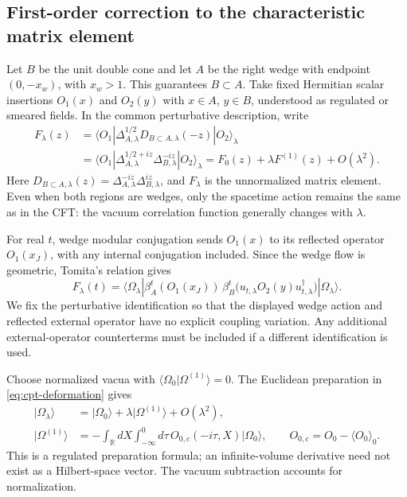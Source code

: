 \documentclass[a4paper,11pt]{article}
\theoremstyle{definition}
\begin{document}
\subsection{First-order correction to the characteristic matrix element}

Let $B$ be the unit double cone and let $A$ be the right wedge with endpoint $(0,-x_w)$, with $x_w>1$. This guarantees $B\subset A$. Take fixed Hermitian scalar insertions $O_1(x)$ and $O_2(y)$ with $x\in A$, $y\in B$, understood as regulated or smeared fields. In the common perturbative description, write
\begin{align}
 F_\lambda(z)&=\langle O_1|\Delta_{A,\lambda}^{1/2}
 D_{B\subset A,\lambda}(-z)|O_2\rangle_\lambda\nonumber\\
 &=\langle O_1|\Delta_{A,\lambda}^{1/2+iz}
 \Delta_{B,\lambda}^{-iz}|O_2\rangle_\lambda
 =F_0(z)+\lambda F^{(1)}(z)+O(\lambda^2).
 \label{eq:cpt-characteristic-expansion}
\end{align}
Here $D_{B\subset A,\lambda}(z)=\Delta_{A,\lambda}^{-iz}\Delta_{B,\lambda}^{iz}$, and $F_\lambda$ is the unnormalized matrix element. Even when both regions are wedges, only the spacetime action remains the same as in the CFT: the vacuum correlation function generally changes with $\lambda$.

For real $t$, wedge modular conjugation sends $O_1(x)$ to its reflected operator $O_1(x_J)$, with any internal conjugation included. Since the wedge flow is geometric, Tomita's relation gives
\begin{equation}
 F_\lambda(t)=\langle\Omega_\lambda|
 \beta_A^t(O_1(x_J))\,
 \beta_B^t\bigl(u_{t,\lambda}O_2(y)u_{t,\lambda}^\dagger\bigr)
 |\Omega_\lambda\rangle.
 \label{eq:cpt-real-characteristic}
\end{equation}
We fix the perturbative identification so that the displayed wedge action and reflected external operator have no explicit coupling variation. Any additional external-operator counterterms must be included if a different identification is used.

Choose normalized vacua with $\langle\Omega_0|\Omega^{(1)}\rangle=0$. The Euclidean preparation in \eqref{eq:cpt-deformation} gives
\begin{align}
 |\Omega_\lambda\rangle&=|\Omega_0\rangle+\lambda|\Omega^{(1)}\rangle+O(\lambda^2),\nonumber\\
 |\Omega^{(1)}\rangle&=-\int_{\mathbb R}dX\int_{-\infty}^0d\tau\,
 O_{0,c}(-i\tau,X)|\Omega_0\rangle,
 \qquad O_{0,c}=O_0-\langle O_0\rangle_0.
 \label{eq:cpt-vacuum-variation}
\end{align}
This is a regulated preparation formula; an infinite-volume derivative need not exist as a Hilbert-space vector. The vacuum subtraction accounts for normalization.
\end{document}
